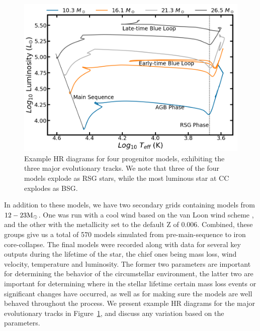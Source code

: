 \documentclass[twocolumn]{aastex631}
\begin{document}
\begin{figure}[hbt!]
    \centering
    \includegraphics[scale=0.25]{exampleHR.png}
    \caption{Example HR diagrams for four progenitor models, exhibiting the three major evolutionary tracks. We note that three of the four models explode as RSG stars, while the most luminous star at CC explodes as BSG.}
    \label{fig:HR}
\end{figure}

In addition to these models, we have two secondary grids containing models from $12-23 \rm M_{\odot}$.  One was run with a cool wind based on the van Loon wind scheme \citep{vl05}, and the other with the metallicity set to the default Z of 0.006.  Combined, these groups give us a total of 570 models simulated from pre-main-sequence to iron core-collapse. The final models were recorded along with data for several key outputs during the lifetime of the star, the chief ones being mass loss, wind velocity, temperature and luminosity.  The former two parameters are important for determining the behavior of the circumstellar environment, the latter two are important for determining where in the stellar lifetime certain mass loss events or significant changes have occurred, as well as for making sure the models are well behaved throughout the process. We present example HR diagrams for the major evolutionary tracks in Figure~\ref{fig:HR}, and discuss any variation based on the parameters. 
\end{document}
